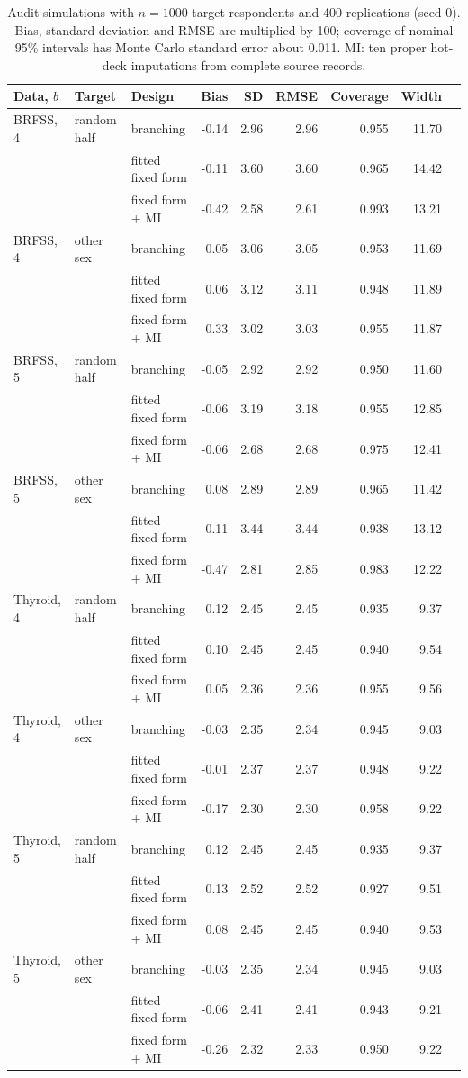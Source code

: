 \begin{table}[h]
\centering
\caption{Audit simulations with $n=1000$ target respondents and 400 replications (seed 0). Bias, standard deviation and RMSE are multiplied by 100; coverage of nominal 95\% intervals has Monte Carlo standard error about 0.011. MI: ten proper hot-deck imputations from complete source records.}
\label{tab:mi}
\small
\begin{tabular}{lllrrrrrr}
\toprule
Data, $b$ & Target & Design & Bias & SD & RMSE & Coverage & Width \\
\midrule
BRFSS, 4 & random half & branching & -0.14 & 2.96 & 2.96 & 0.955 & 11.70 \\
 &  & fitted fixed form & -0.11 & 3.60 & 3.60 & 0.965 & 14.42 \\
 &  & fixed form + MI & -0.42 & 2.58 & 2.61 & 0.993 & 13.21 \\
BRFSS, 4 & other sex & branching & 0.05 & 3.06 & 3.05 & 0.953 & 11.69 \\
 &  & fitted fixed form & 0.06 & 3.12 & 3.11 & 0.948 & 11.89 \\
 &  & fixed form + MI & 0.33 & 3.02 & 3.03 & 0.955 & 11.87 \\
BRFSS, 5 & random half & branching & -0.05 & 2.92 & 2.92 & 0.950 & 11.60 \\
 &  & fitted fixed form & -0.06 & 3.19 & 3.18 & 0.955 & 12.85 \\
 &  & fixed form + MI & -0.06 & 2.68 & 2.68 & 0.975 & 12.41 \\
BRFSS, 5 & other sex & branching & 0.08 & 2.89 & 2.89 & 0.965 & 11.42 \\
 &  & fitted fixed form & 0.11 & 3.44 & 3.44 & 0.938 & 13.12 \\
 &  & fixed form + MI & -0.47 & 2.81 & 2.85 & 0.983 & 12.22 \\
Thyroid, 4 & random half & branching & 0.12 & 2.45 & 2.45 & 0.935 & 9.37 \\
 &  & fitted fixed form & 0.10 & 2.45 & 2.45 & 0.940 & 9.54 \\
 &  & fixed form + MI & 0.05 & 2.36 & 2.36 & 0.955 & 9.56 \\
Thyroid, 4 & other sex & branching & -0.03 & 2.35 & 2.34 & 0.945 & 9.03 \\
 &  & fitted fixed form & -0.01 & 2.37 & 2.37 & 0.948 & 9.22 \\
 &  & fixed form + MI & -0.17 & 2.30 & 2.30 & 0.958 & 9.22 \\
Thyroid, 5 & random half & branching & 0.12 & 2.45 & 2.45 & 0.935 & 9.37 \\
 &  & fitted fixed form & 0.13 & 2.52 & 2.52 & 0.927 & 9.51 \\
 &  & fixed form + MI & 0.08 & 2.45 & 2.45 & 0.940 & 9.53 \\
Thyroid, 5 & other sex & branching & -0.03 & 2.35 & 2.34 & 0.945 & 9.03 \\
 &  & fitted fixed form & -0.06 & 2.41 & 2.41 & 0.943 & 9.21 \\
 &  & fixed form + MI & -0.26 & 2.32 & 2.33 & 0.950 & 9.22 \\
\bottomrule
\end{tabular}
\end{table}
